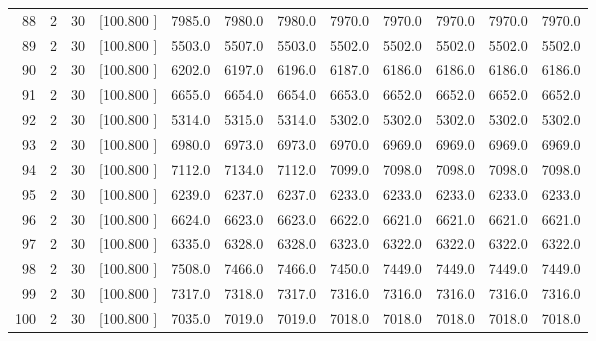 \documentclass[12pt,a4paper]{article}
\begin{document}
\begin{center}
{\begin{tabular}{r r r r r r r r r r r r}
  88&  2& 30&[100.800   ]&  7985.0&  7980.0&  7980.0&  7970.0&  7970.0&  7970.0&  7970.0&  7970.0\\[-0.02in]
  89&  2& 30&[100.800   ]&  5503.0&  5507.0&  5503.0&  5502.0&  5502.0&  5502.0&  5502.0&  5502.0\\[-0.02in]
  90&  2& 30&[100.800   ]&  6202.0&  6197.0&  6196.0&  6187.0&  6186.0&  6186.0&  6186.0&  6186.0\\[-0.02in]
  91&  2& 30&[100.800   ]&  6655.0&  6654.0&  6654.0&  6653.0&  6652.0&  6652.0&  6652.0&  6652.0\\[-0.02in]
  92&  2& 30&[100.800   ]&  5314.0&  5315.0&  5314.0&  5302.0&  5302.0&  5302.0&  5302.0&  5302.0\\[-0.02in]
  93&  2& 30&[100.800   ]&  6980.0&  6973.0&  6973.0&  6970.0&  6969.0&  6969.0&  6969.0&  6969.0\\[-0.02in]
  94&  2& 30&[100.800   ]&  7112.0&  7134.0&  7112.0&  7099.0&  7098.0&  7098.0&  7098.0&  7098.0\\[-0.02in]
  95&  2& 30&[100.800   ]&  6239.0&  6237.0&  6237.0&  6233.0&  6233.0&  6233.0&  6233.0&  6233.0\\[-0.02in]
  96&  2& 30&[100.800   ]&  6624.0&  6623.0&  6623.0&  6622.0&  6621.0&  6621.0&  6621.0&  6621.0\\[-0.02in]
  97&  2& 30&[100.800   ]&  6335.0&  6328.0&  6328.0&  6323.0&  6322.0&  6322.0&  6322.0&  6322.0\\[-0.02in]
  98&  2& 30&[100.800   ]&  7508.0&  7466.0&  7466.0&  7450.0&  7449.0&  7449.0&  7449.0&  7449.0\\[-0.02in]
  99&  2& 30&[100.800   ]&  7317.0&  7318.0&  7317.0&  7316.0&  7316.0&  7316.0&  7316.0&  7316.0\\[-0.02in]
 100&  2& 30&[100.800   ]&  7035.0&  7019.0&  7019.0&  7018.0&  7018.0&  7018.0&  7018.0&  7018.0\\[-0.02in]

\hline
\end{tabular}}
\end{center}
\newpage
\end{document}
